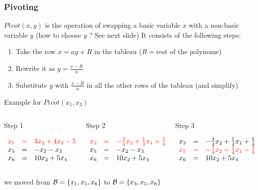 \begin{frame}
  \frametitle{Pivoting}

  \scriptsize

  $Pivot(x,y)$ is the operation of swapping a basic variable $x$ with a non-basic variable $y$ 
  (how to choose $y$ ? See next slide)
  \vfill
  It consists of the following steps:
  \begin{enumerate}
    \item Take the row $x = a y + R$ in the tableau ($R = \mbox{rest of the polynome}$)
    \item Rewrite it as $y = \frac{x - R}{a}$
    \item Substitute $y$ with $\frac{x - R}{a}$ in all the other rows of the tableau (and simplify)
  \end{enumerate}
  \vfill\pause
  Example for $Pivot(x_1,x_3)$
  \vfill
  \begin{columns}

    \begin{column}{.33\textwidth}
      \begin{center}
      Step 1 
      \end{center}
      $$
      \begin{array}{rcl}
	\textcolor{red}{x_1} & \textcolor{red}{=} & \textcolor{red}{3 x_2 + 4 x_3 - 5 x_4} \\
	x_5 & = & - x_2 - x_3 \\
	x_6 & = & 10 x_2 + 5 x_4	
      \end{array}
      $$
    \end{column}

    \begin{column}{.33\textwidth}
      \begin{center}
      Step 2 
      \end{center}
      $$
      \begin{array}{rcl}
	\textcolor{red}{x_3} & \textcolor{red}{=} & \textcolor{red}{-\frac{3}{4} x_2 + \frac{1}{4} x_1 + \frac{5}{4} x_4} \\
	x_5 & = & - x_2 - x_3 \\
	x_6 & = & 10 x_2 + 5 x_4	
      \end{array}
      $$
    \end{column}

    \begin{column}{.33\textwidth}
      \begin{center}
      Step 3 
      \end{center}
      $$
      \begin{array}{rcl}
	x_3 & = & -\frac{3}{4} x_2 + \frac{1}{4} x_1 + \frac{5}{4} x_4 \\
	\textcolor{red}{x_5} & \textcolor{red}{=} & \textcolor{red}{- \frac{1}{4} x_2 -\frac{1}{4} x_1 - \frac{5}{4} x_4} \\
	x_6 & = & 10 x_2 + 5 x_4	
      \end{array}
      $$
    \end{column}

  \end{columns}
  \vfill\pause
  we moved from $\mathcal{B} = \{ x_1, x_5, x_6 \}$ to $\mathcal{B} = \{ x_3, x_5, x_6 \}$ 

\end{frame}

